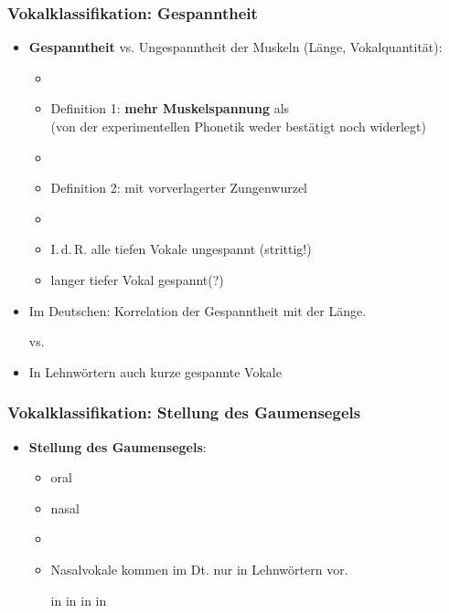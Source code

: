 \begin{frame}
\frametitle{Vokalklassifikation: Gespanntheit}

	\begin{itemize}
		\item \textbf{Gespanntheit} vs. Ungespanntheit der Muskeln (Länge, Vokalquantität):
		
		\begin{itemize}
			\item[]
			\item Definition 1: \textipa{[ i:, y:, u:, o: ]} \textbf{mehr Muskelspannung} als \textipa{[ I, Y, U , O ]}\\
			(von der experimentellen Phonetik weder bestätigt noch widerlegt)
			\item[]
			\item Definition 2: mit vorverlagerter Zungenwurzel
			\item[]
			\item I.\,d.\,R. alle tiefen Vokale \ras ungespannt (strittig!)
			\item langer tiefer Vokal \textipa{[ a: ]} \ras gespannt(?)
		\end{itemize}

	      \item Im Deutschen: Korrelation der Gespanntheit mit der Länge.

		\ea \textipa{[ m i: t @ ]} vs. \textipa{[ m I t @ ]}
		\z

		\item In Lehnwörtern auch kurze gespannte Vokale

		\ea \textipa{[ P i . d e: ]}
		\z
		
	\end{itemize}
	
\end{frame}


\begin{frame}
\frametitle{Vokalklassifikation: Stellung des Gaumensegels}

	\begin{itemize}
	
		
		
		\item \textbf{Stellung des Gaumensegels}:
		
		\begin{itemize}
			\item oral
			\item nasal
			\item[]
			\item Nasalvokale kommen im Dt. nur in Lehnwörtern vor.

			\eal
			\ex \textipa{[ \~a ]} in 
			\ex \textipa{[ \~E ]} in 
			\ex \textipa{[ \~a ]} in 
			\ex \textipa{[ \~\oe\ ]} in 
			\zl
		
		\end{itemize}
		
	\end{itemize}
	
\end{frame}


